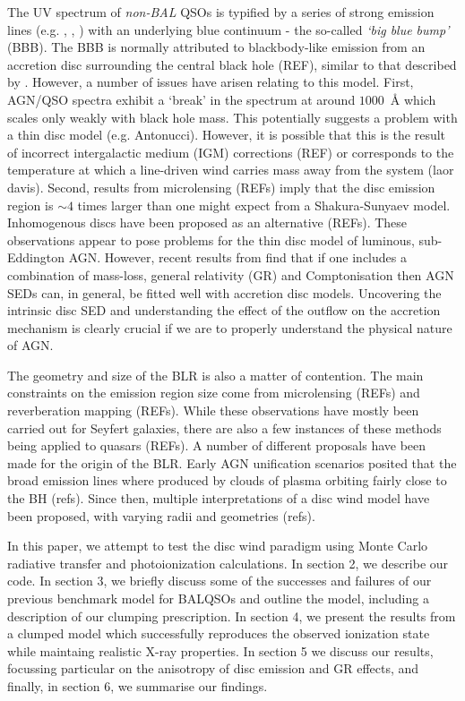 \documentclass[useAMS,usenatbib]{mn2e_x}
\begin{document}
The UV spectrum of {\em non-BAL} QSOs is typified by a series
of strong emission lines (e.g. \la, \civ, \nv) with an underlying blue continuum
- the so-called {\sl `big blue bump'} (BBB). The BBB is normally attributed to blackbody-like
emission from an accretion disc surrounding the central black hole (REF), similar
to that described by \cite{shakurasunyaev1973}. However,
a number of issues have arisen relating to this model. First, 
AGN/QSO spectra exhibit a `break' in the spectrum at around $1000$~\AA 
which scales only weakly with black hole mass. This potentially 
suggests a problem with a thin disc model (e.g. Antonucci). 
However, it is possible that this is the result of incorrect intergalactic medium
(IGM) corrections (REF) or corresponds to the temperature 
at which a line-driven wind carries mass away from the system (laor davis).
Second, results from microlensing (REFs) imply that the disc emission 
region is $\sim4$ times larger than one might expect from a Shakura-Sunyaev
model. Inhomogenous discs have been proposed as an alternative (REFs).
These observations appear to pose problems for the thin disc model of luminous,
sub-Eddington AGN. However, recent results from \cite{capellupo2015} find 
that if one includes a combination of mass-loss, general relativity (GR) and Comptonisation
then AGN SEDs can, in general, be fitted well with accretion disc models.
Uncovering the intrinsic disc SED and understanding the effect of the outflow on the accretion 
mechanism is clearly crucial if we are to properly understand the physical nature
of AGN.

The geometry and size of the BLR is also a matter of contention. 
The main constraints on the emission region size come from microlensing (REFs)
and reverberation mapping (REFs). While these observations have mostly been
carried out for Seyfert galaxies, there are also a few instances of these methods
being applied to quasars (REFs). A number of different proposals have been made 
for the origin of the BLR. Early AGN unification scenarios posited that the broad emission lines
where produced by clouds of plasma orbiting fairly close to the BH (refs).
Since then, multiple interpretations of a disc wind model have been proposed,
with varying radii and geometries (refs). 

In this paper, we attempt to test the disc wind paradigm 
using Monte Carlo radiative transfer and photoionization calculations.
In section 2, we describe our code. In section 3, we briefly discuss some 
of the successes and failures of our previous benchmark model for BALQSOs 
\citep[][hereafter H13]{higginbottom2013} and outline the model, including 
a description of our clumping prescription. In section 4, we present the results 
from a clumped model which successfully reproduces
the observed ionization state while maintaing realistic X-ray properties.
In section 5 we discuss our results, focussing particular on the anisotropy of 
disc emission and GR effects, and finally, in section 6, we summarise our findings.
\end{document}
